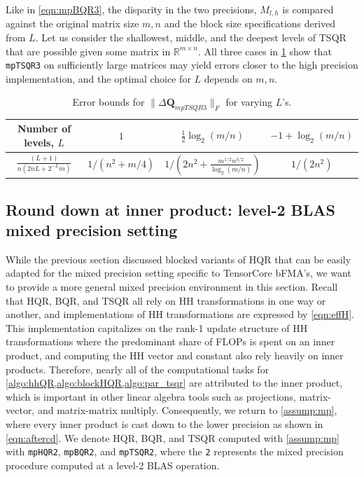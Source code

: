 \documentclass[review,onefignum,onetabnum]{siamart190516}
\newcommand{\R}{\mathbb{R}}
\newcommand{\bb}[1]{\mathbf{#1}}
\begin{document}
Like in \cref{eqn:mpBQR3}, the disparity in the two precisions, $M_{l,h}$ is compared against the original matrix size $m,n$ and the block size specifications derived from $L$.
Let us consider the shallowest, middle, and the deepest levels of TSQR that are possible given some matrix in $\R^{m\times n}$.
All three cases in \cref{table:mpTSQR3} show that {\tt mpTSQR3} on sufficiently large matrices may yield errors closer to the high precision implementation, and the optimal choice for $L$ depends on $m,n$. 
\begin{table}[H]
	\center
	\begin{tabular}{||c|c|c|c||} 
		\hline
		 Number of levels, $L$& $1$ & $\frac{1}{2}\log_2(m/n)$ & $-1+\log_2(m/n)$ \\ \hline
		$\frac{(L+1)}{n(2nL+2^{-L}m)}$&  $1/(n^2+m/4)$ &$1/\left(2n^2+\frac{m^{1/2}n^{3/2}}{\log_2(m/n)}\right)$ & $1/(2n^2)$\\ \hline
	\end{tabular}
	\caption{Error bounds for $\|\Delta \bb{Q}_{mpTSQR3}\|_F$ for varying $L$'s.} 
	\label{table:mpTSQR3}
\end{table} 
\vspace{-1cm}
%
\subsection{Round down at inner product: level-2 BLAS mixed precision setting}\label{sec:mp-2}
While the previous section discussed blocked variants of HQR that can be easily adapted for the mixed precision setting specific to TensorCore bFMA's, we want to provide a more general mixed precision environment in this section.
Recall that HQR, BQR, and TSQR all rely on HH transformations in one way or another, and implementations of HH transformations are expressed by \cref{eqn:effH}.
This implementation capitalizes on the rank-1 update structure of HH transformations where the predominant share of FLOPs is spent on an inner product, and computing the HH vector and constant also rely heavily on inner products.
Therefore, nearly all of the computational tasks for \cref{algo:hhQR,algo:blockHQR,algo:par_tsqr} are attributed to the inner product, which is important in other linear algebra tools such as projections, matrix-vector, and matrix-matrix multiply.
Consequently, we return to \cref{assump:mp}, where every inner product is cast down to the lower precision as shown in \cref{eqn:aftercd}. 
We denote HQR, BQR, and TSQR computed with \cref{assump:mp} with {\tt mpHQR2}, {\tt mpBQR2}, and {\tt mpTSQR2}, where the {\tt 2} represents the mixed precision procedure computed at a level-2 BLAS operation.
\end{document}
